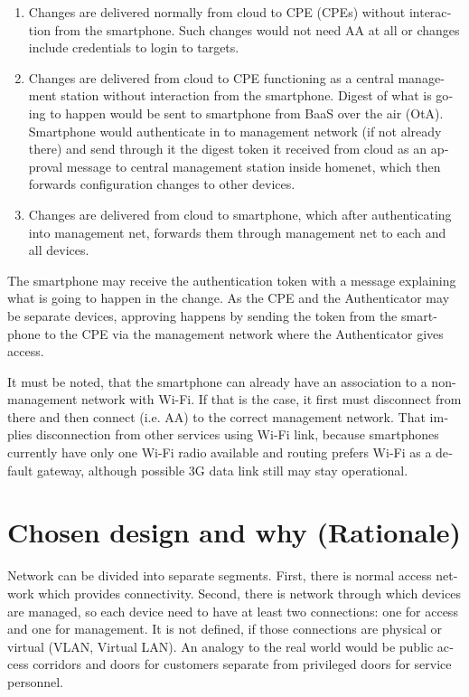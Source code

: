 \documentclass[12pt,a4paper,english]{tutthesis}
\begin{document}
\begin{otherlanguage}{english}
\begin{enumerate}
\item Changes are delivered normally from cloud to CPE (CPEs) without
interaction from the smartphone. Such changes would not need
AA at all or changes include credentials to login to targets.

\item Changes are delivered from cloud to CPE functioning as a central
management station without interaction from the smartphone.  Digest
of what is going to happen would be sent to smartphone from BaaS
over the air (OtA). Smartphone would authenticate in to management
network (if not already there) and send through it the digest token
it received from cloud as an approval message to central management
station inside homenet, which then forwards configuration changes
to other devices.

\item Changes are delivered from cloud to smartphone, which after
authenticating into management net, forwards them through management
net to each and all devices.
\end{enumerate}


The smartphone may receive the authentication token with 
a message explaining what is going to happen in the change.
As the CPE and the Authenticator may be separate devices, approving
happens by sending the token from the smartphone to the CPE via the
management network where the Authenticator gives access.

It must be noted, that the smartphone can already have an association
to a non-management network with Wi-Fi. If that is the case, it first
must disconnect from there and then connect (i.e. AA) to the correct management
network. That implies disconnection from other services using Wi-Fi
link, because smartphones currently have only one Wi-Fi radio
available and routing prefers Wi-Fi as a default gateway, although
possible 3G data link still may stay operational.


\section{Chosen design and why (Rationale)}
\label{sec-4-3}
\label{sec:chosendesign}   
Network can be divided into separate segments. 
First, there is normal access network which provides
connectivity. Second, there is network through which devices are
managed, so each device need to have at least two connections: one for
access and one for management. It is not defined, if those connections
are physical or virtual (VLAN, Virtual LAN). 
An analogy to the real world would be public access corridors and doors for
customers separate from privileged doors for service personnel.


\end{otherlanguage}
\end{document}
